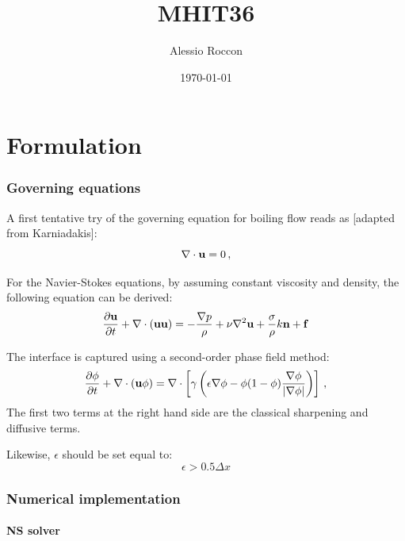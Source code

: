 \documentclass[11pt]{article}
\title{MHIT36}
\author{Alessio Roccon}
\date{\today}
\begin{document}
\maketitle	
\pagebreak


\part{Formulation}

\section{Governing equations}

A first tentative try of the governing equation for boiling flow reads as [adapted from Karniadakis]:
\begin{equation}
\nabla \cdot  {\bf u} =  0\, ,
\end{equation}

For the Navier-Stokes equations, by assuming constant viscosity and density, the following equation can be derived:
\begin{equation}
\frac{\partial {\bf u}}{\partial t} + \nabla \cdot ({\bf u}{\bf u})= - \frac{ \nabla p}{\rho}  +  \nu \nabla^2 {\bf u}  + \frac{ \sigma}{\rho} k {\bf n} + {\bf f}
\end{equation}

The interface is captured using a second-order phase field method:
\begin{equation}
\frac{\partial \phi}{\partial t} +  \nabla \cdot ( {{\bf u} \phi }) = \nabla \cdot \left[ \gamma \left (\epsilon \nabla \phi  - \phi (1-\phi) \frac{\nabla \phi}{|\nabla \phi|}  \right) \right] \, ,
\end{equation}
The first two terms at the right hand side are the classical sharpening and diffusive terms.

Likewise, $\epsilon$ should be set equal to: 
\begin{equation}
\epsilon > 0.5 \Delta x
\end{equation}

\section{Numerical implementation}


\subsection{NS solver}
\end{document}
